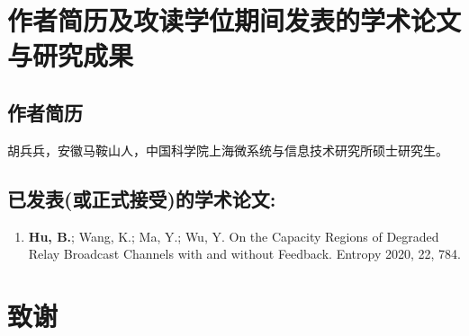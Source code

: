 \chapter{作者简历及攻读学位期间发表的学术论文与研究成果}


\section*{作者简历}

胡兵兵，安徽马鞍山人，中国科学院上海微系统与信息技术研究所硕士研究生。

\section*{已发表(或正式接受)的学术论文:}

{
\setlist[enumerate]{}%
\begin{enumerate}[nosep]
    \item \textbf{Hu, B.}; Wang, K.; Ma, Y.; Wu, Y. On the Capacity Regions of Degraded Relay Broadcast Channels with and without Feedback. Entropy 2020, 22, 784.
\end{enumerate}
}

% 
% 
% 

\chapter[致谢]{致\quad 谢}%
\thispagestyle{noheaderstyle}%

